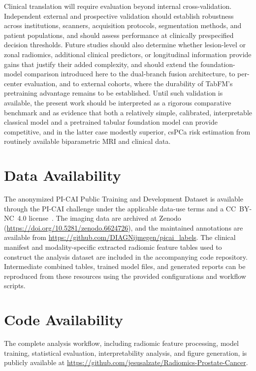 \documentclass[11pt]{article}
\begin{document}
Clinical translation will require evaluation beyond internal cross-validation.
Independent external and prospective validation should establish robustness
across institutions, scanners, acquisition protocols, segmentation methods, and
patient populations, and should assess performance at clinically prespecified
decision thresholds. Future studies should also determine whether lesion-level
or zonal radiomics, additional clinical predictors, or longitudinal information
provide gains that justify their added complexity, and should extend the
foundation-model comparison introduced here to the dual-branch fusion
architecture, to per-center evaluation, and to external cohorts, where the
durability of TabFM's pretraining advantage remains to be established. Until
such validation is available, the present work should be interpreted as a
rigorous comparative benchmark and as evidence that both a relatively simple,
calibrated, interpretable classical model and a pretrained tabular foundation
model can provide competitive, and in the latter case modestly superior, csPCa
risk estimation from routinely available biparametric MRI and clinical data.

\section*{Data Availability}
The anonymized PI-CAI Public Training and Development Dataset is available
through the PI-CAI challenge under the applicable data-use terms and a
CC~BY-NC~4.0 license~\citep{saha2023artificial}. The imaging data are archived
at Zenodo (\url{https://doi.org/10.5281/zenodo.6624726}), and the maintained
annotations are available from
\url{https://github.com/DIAGNijmegen/picai_labels}. The clinical manifest and
modality-specific extracted radiomic feature tables used to construct the
analysis dataset are included in the accompanying code repository. Intermediate
combined tables, trained model files, and generated reports can be reproduced
from these resources using the provided configurations and workflow scripts.

\section*{Code Availability}
The complete analysis workflow, including radiomic feature processing, model
training, statistical evaluation, interpretability analysis, and figure
generation, is publicly available at
\url{https://github.com/jesusalzate/Radiomics-Prostate-Cancer}.
\end{document}

